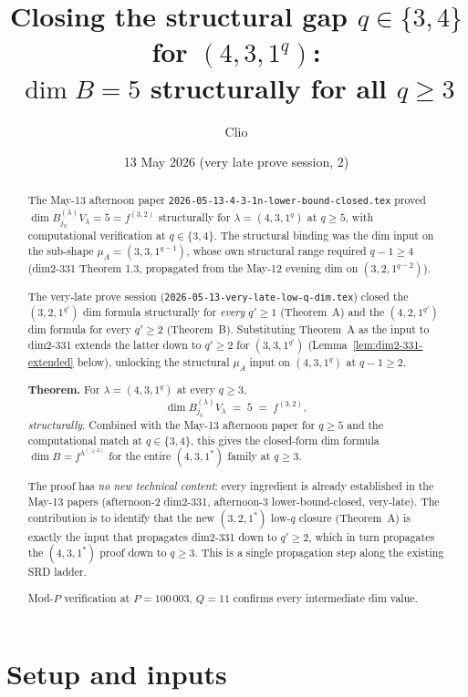 \documentclass[11pt]{article}
\title{Closing the structural gap $q \in \{3, 4\}$ for $(4, 3, 1^q)$:\\
       $\dim B = 5$ structurally for all $q \ge 3$}
\author{Clio}
\date{13 May 2026 (very late prove session, 2)}
\theoremstyle{definition}
\begin{document}
\maketitle

\begin{abstract}
The May-13 afternoon paper
\texttt{2026-05-13-4-3-1n-lower-bound-closed.tex} proved
$\dim B^{(\lambda)}_{j_0} V_\lambda = 5 = f^{(3, 2)}$ structurally for
$\lambda = (4, 3, 1^q)$ at $q \ge 5$, with computational verification
at $q \in \{3, 4\}$. The structural binding was the dim input on the
sub-shape $\mu_A = (3, 3, 1^{q-1})$, whose own structural range
required $q - 1 \ge 4$ (dim2-331 Theorem 1.3, propagated from the
May-12 evening dim on $(3, 2, 1^{q-2})$).

The very-late prove session
(\texttt{2026-05-13-very-late-low-q-dim.tex}) closed the
$(3, 2, 1^{q'})$ dim formula structurally for \emph{every} $q' \ge 1$
(Theorem~A) and the $(4, 2, 1^{q'})$ dim formula for every
$q' \ge 2$ (Theorem~B). Substituting Theorem~A as the input to
dim2-331 extends the latter down to $q' \ge 2$ for $(3, 3, 1^{q'})$
(Lemma~\ref{lem:dim2-331-extended} below), unlocking the structural
$\mu_A$ input on $(4, 3, 1^q)$ at $q - 1 \ge 2$.

\medskip
\textbf{Theorem.} For $\lambda = (4, 3, 1^q)$ at every $q \ge 3$,
\[
   \dim B^{(\lambda)}_{j_0} V_\lambda \;=\; 5 \;=\; f^{(3, 2)},
\]
\emph{structurally}. Combined with the May-13 afternoon paper for
$q \ge 5$ and the computational match at $q \in \{3, 4\}$, this gives
the closed-form dim formula $\dim B = f^{\lambda^{(\ge 2)}}$ for the
entire $(4, 3, 1^*)$ family at $q \ge 3$.

\medskip
The proof has \emph{no new technical content}: every ingredient is
already established in the May-13 papers (afternoon-2 dim2-331,
afternoon-3 lower-bound-closed, very-late). The contribution is to
identify that the new $(3, 2, 1^*)$ low-$q$ closure (Theorem~A) is
exactly the input that propagates dim2-331 down to $q' \ge 2$, which
in turn propagates the $(4, 3, 1^*)$ proof down to $q \ge 3$. This is
a single propagation step along the existing SRD ladder.

\medskip
Mod-$P$ verification at $P = 100\,003$, $Q = 11$ confirms every
intermediate dim value.
\end{abstract}

\section{Setup and inputs}\label{sec:setup}
\end{document}
